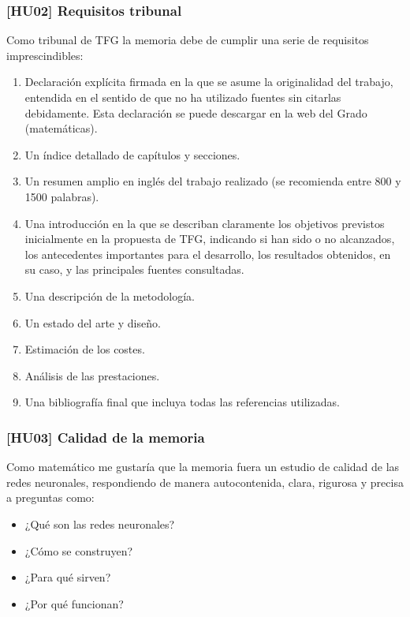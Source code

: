 \subsubsection*{[HU02] Requisitos tribunal}
Como tribunal de TFG la memoria debe de cumplir una serie de requisitos imprescindibles:

\begin{enumerate}
    \item Declaración explícita firmada en la que se asume la originalidad del trabajo, entendida en el sentido de que no ha utilizado fuentes sin citarlas debidamente. Esta declaración se puede descargar en la web del Grado (matemáticas).
    \item Un índice detallado de capítulos y secciones.
    \item Un resumen amplio en inglés del trabajo realizado (se recomienda entre 800 y 1500 palabras).
    \item Una introducción en la que se describan claramente los objetivos previstos inicialmente en la propuesta de TFG, indicando si han sido o no alcanzados, los antecedentes importantes para el desarrollo, los resultados obtenidos, en su caso, y las principales fuentes consultadas.
    \item Una descripción de la metodología.
    \item Un estado del arte y diseño.
    \item Estimación de los costes.
    \item Análisis de las prestaciones.
    \item Una bibliografía final que incluya todas las referencias utilizadas.
\end{enumerate}


\subsubsection*{ [HU03] Calidad de la memoria}
Como matemático me gustaría que la memoria fuera un estudio de calidad de las redes neuronales, 
respondiendo de manera autocontenida, clara, rigurosa y precisa a preguntas como:
\begin{itemize}
    \item ¿Qué son las redes neuronales?
    \item ¿Cómo se construyen?
    \item ¿Para qué sirven?
    \item ¿Por qué funcionan?
\end{itemize}

